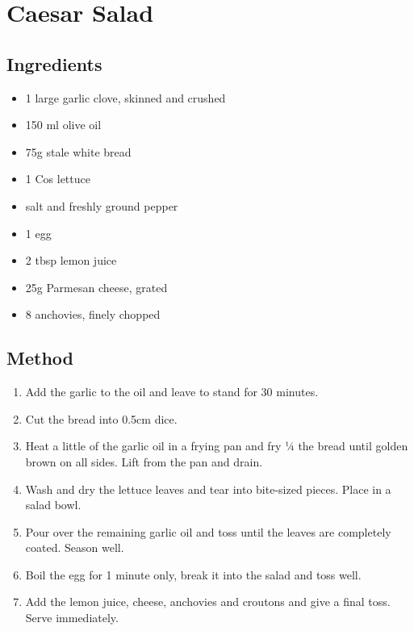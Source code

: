 \clearpage
\section{Caesar Salad}

  
\subsection{Ingredients}

\begin{itemize}
	\item 1 large garlic clove, skinned and crushed
	\item 150 ml olive oil
	\item 75g stale white bread
	\item 1 Cos lettuce
	\item salt and freshly ground pepper
	\item 1 egg
	\item 2 tbsp lemon juice
	\item 25g Parmesan cheese, grated
	\item 8 anchovies, finely chopped
\end{itemize}

\subsection{Method}

\begin{enumerate}
	\item Add the garlic to the oil and leave to stand for 30 minutes.
	\item Cut the bread into 0.5cm dice.
	\item Heat a little of the garlic oil in a frying pan and fry ¼ the bread until golden brown on all sides. Lift from the pan and drain.
	\item Wash and dry the lettuce leaves and tear into bite-sized pieces. Place in a salad bowl.
	\item Pour over the remaining garlic oil and toss until the leaves are completely coated. Season well.
	\item Boil the egg for 1 minute only, break it into the salad and toss well.
	\item Add the lemon juice, cheese, anchovies and croutons and give a final toss. Serve immediately.
\end{enumerate}
